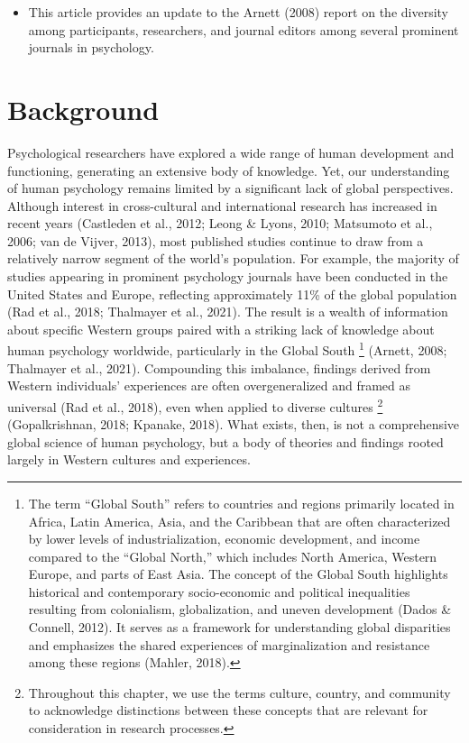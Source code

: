 \documentclass[
  11pt,
]{book}
\providecommand{\tightlist}{%
  \setlength{\itemsep}{0pt}\setlength{\parskip}{0pt}}
\begin{document}
\begin{itemize}
  \begin{itemize}
  \tightlist
  \item
    This article provides an update to the Arnett (2008) report on the diversity among participants, researchers, and journal editors among several prominent journals in psychology.
  \end{itemize}
\end{itemize}

\section{Background}\label{background}

Psychological researchers have explored a wide range of human development and functioning, generating an extensive body of knowledge. Yet, our understanding of human psychology remains limited by a significant lack of global perspectives. Although interest in cross-cultural and international research has increased in recent years (Castleden et al., 2012; Leong \& Lyons, 2010; Matsumoto et al., 2006; van de Vijver, 2013), most published studies continue to draw from a relatively narrow segment of the world's population. For example, the majority of studies appearing in prominent psychology journals have been conducted in the United States and Europe, reflecting approximately 11\% of the global population (Rad et al., 2018; Thalmayer et al., 2021). The result is a wealth of information about specific Western groups paired with a striking lack of knowledge about human psychology worldwide, particularly in the Global South \footnote{The term ``Global South'' refers to countries and regions primarily located in Africa, Latin America, Asia, and the Caribbean that are often characterized by lower levels of industrialization, economic development, and income compared to the ``Global North,'' which includes North America, Western Europe, and parts of East Asia. The concept of the Global South highlights historical and contemporary socio-economic and political inequalities resulting from colonialism, globalization, and uneven development (Dados \& Connell, 2012). It serves as a framework for understanding global disparities and emphasizes the shared experiences of marginalization and resistance among these regions (Mahler, 2018).} (Arnett, 2008; Thalmayer et al., 2021). Compounding this imbalance, findings derived from Western individuals' experiences are often overgeneralized and framed as universal (Rad et al., 2018), even when applied to diverse cultures \footnote{Throughout this chapter, we use the terms culture, country, and community to acknowledge distinctions between these concepts that are relevant for consideration in research processes.} (Gopalkrishnan, 2018; Kpanake, 2018). What exists, then, is not a comprehensive global science of human psychology, but a body of theories and findings rooted largely in Western cultures and experiences.
\end{document}
